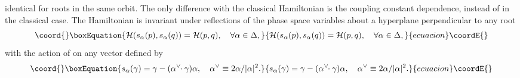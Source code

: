 \documentclass[a4paper,12pt]{article}
\begin{document}
identical for roots in the same orbit.
The only difference with the classical Hamiltonian is the
coupling constant dependence, \coordHE{} instead of
\coordHE{} in the classical case.
The Hamiltonian is invariant under reflections of the phase space
variables about a hyperplane perpendicular to any root
\begin{equation}\coord{}\boxEquation{
  {\cal H}(s_{\alpha}(p),s_{\alpha}(q))={\cal H}(p,q), \quad
   \forall\alpha\in\Delta,
  \label{HamCoxinv}
}{
  {\cal H}(s_{\alpha}(p),s_{\alpha}(q))={\cal H}(p,q), \quad
   \forall\alpha\in\Delta,
  }{ecuacion}\coordE{}\end{equation}
with the action of \coordHE{} on any vector
\coordHE{} defined by
\begin{equation}\coord{}\boxEquation{
   \label{Root_reflection}
   s_{\alpha}(\gamma)=\gamma-(\alpha^{\vee}\!\!\cdot\gamma)\alpha,\quad
   \alpha^{\vee}\equiv2\alpha/|\alpha|^{2}.
}{
   s_{\alpha}(\gamma)=\gamma-(\alpha^{\vee}\!\!\cdot\gamma)\alpha,\quad
   \alpha^{\vee}\equiv2\alpha/|\alpha|^{2}.
}{ecuacion}\coordE{}\end{equation}
\end{document}

